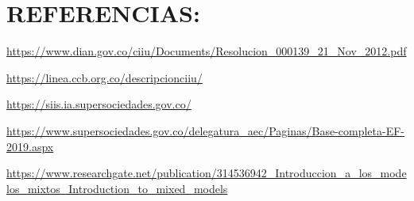 \documentclass[
  11pt,
  a4paper,
]{book}
\begin{document}
\hypertarget{referencias}{%
\chapter{REFERENCIAS:}\label{referencias}}

\url{https://www.dian.gov.co/ciiu/Documents/Resolucion_000139_21_Nov_2012.pdf}

\url{https://linea.ccb.org.co/descripcionciiu/}

\url{https://siis.ia.supersociedades.gov.co/}

\url{https://www.supersociedades.gov.co/delegatura_aec/Paginas/Base-completa-EF-2019.aspx}

\url{https://www.researchgate.net/publication/314536942_Introduccion_a_los_modelos_mixtos_Introduction_to_mixed_models}

\backmatter
\end{document}
